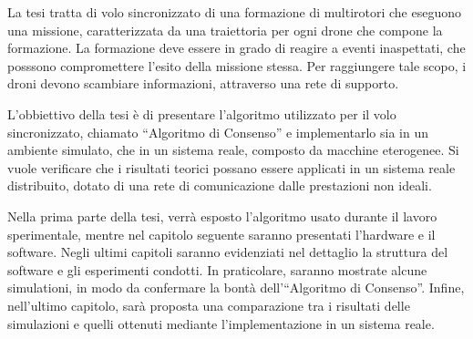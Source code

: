
La tesi tratta di volo sincronizzato di una formazione di multirotori che eseguono una missione,
caratterizzata da una traiettoria per ogni drone che compone la formazione.
La formazione deve essere in grado di reagire a eventi inaspettati, che posssono
compromettere l'esito della missione stessa.
Per raggiungere tale scopo, i droni devono scambiare informazioni, attraverso
una rete di supporto.

L'obbiettivo della tesi è di presentare l'algoritmo utilizzato per il volo sincronizzato,
chiamato “Algoritmo di Consenso” e implementarlo sia in un ambiente simulato,
che in un sistema reale, composto da macchine eterogenee. Si vuole verificare che
i risultati teorici possano essere applicati in un sistema reale distribuito, dotato di
una rete di comunicazione dalle prestazioni non ideali.

Nella prima parte della tesi, verrà esposto l'algoritmo usato durante il lavoro sperimentale,
mentre nel capitolo seguente saranno presentati l'hardware e il software.
Negli ultimi capitoli saranno evidenziati nel dettaglio la struttura del software
e gli esperimenti condotti.
In praticolare, saranno mostrate alcune simulationi, in modo da confermare la bontà
dell'“Algoritmo di Consenso”.
Infine, nell'ultimo capitolo, sarà proposta una comparazione tra i risultati
delle simulazioni e quelli ottenuti mediante l'implementazione in un sistema reale.
